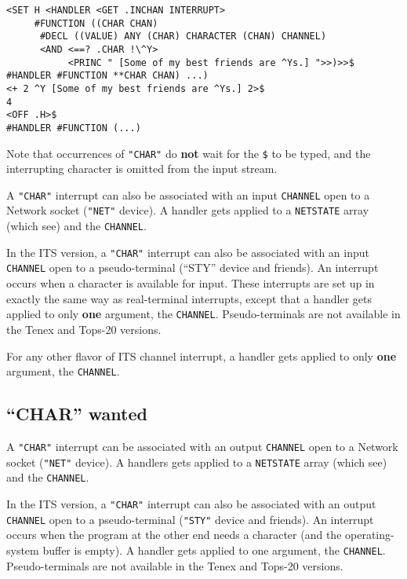 \documentclass[a4paper]{scrbook}
\begin{document}
\begin{verbatim}
<SET H <HANDLER <GET .INCHAN INTERRUPT>
     #FUNCTION ((CHAR CHAN)
      #DECL ((VALUE) ANY (CHAR) CHARACTER (CHAN) CHANNEL)
      <AND <==? .CHAR !\^Y>
           <PRINC " [Some of my best friends are ^Ys.] ">>)>>$
#HANDLER #FUNCTION **CHAR CHAN) ...)
<+ 2 ^Y [Some of my best friends are ^Ys.] 2>$
4
<OFF .H>$
#HANDLER #FUNCTION (...)
\end{verbatim}

Note that occurrences of \texttt{"CHAR"} do \textbf{not} wait for the \texttt{\$} to be typed, and the interrupting
character is omitted from the input stream.

A \texttt{"CHAR"} interrupt can also be associated with an input \texttt{CHANNEL} open to a Network socket (\texttt{"NET"}
device). A handler gets applied to a \texttt{NETSTATE} array (which see) and the \texttt{CHANNEL}.

In the ITS version, a \texttt{"CHAR"} interrupt can also be associated with an input \texttt{CHANNEL} open to a
pseudo-terminal (``STY'' device and friends). An interrupt occurs when a character is available for input. These interrupts
are set up in exactly the same way as real-terminal interrupts, except that a handler gets applied to only \textbf{one}
argument, the \texttt{CHANNEL}. Pseudo-terminals are not available in the Tenex and Tops-20 versions.

For any other flavor of ITS channel interrupt, a handler gets applied to only \textbf{one} argument, the \texttt{CHANNEL}.

\subsection{\texorpdfstring{``CHAR'' wanted}{21.8.2. CHAR wanted}}\label{char-wanted}

A \texttt{"CHAR"} interrupt can be associated with an output \texttt{CHANNEL} open to a Network socket (\texttt{"NET"}
device). A handlers gets applied to a \texttt{NETSTATE} array (which see) and the \texttt{CHANNEL}.

In the ITS version, a \texttt{"CHAR"} interrupt can also be associated with an output \texttt{CHANNEL} open to a
pseudo-terminal (\texttt{"STY"} device and friends). An interrupt occurs when the program at the other end needs a
character (and the operating-system buffer is empty). A handler gets applied to one argument, the \texttt{CHANNEL}.
Pseudo-terminals are not available in the Tenex and Tops-20 versions.
\end{document}
